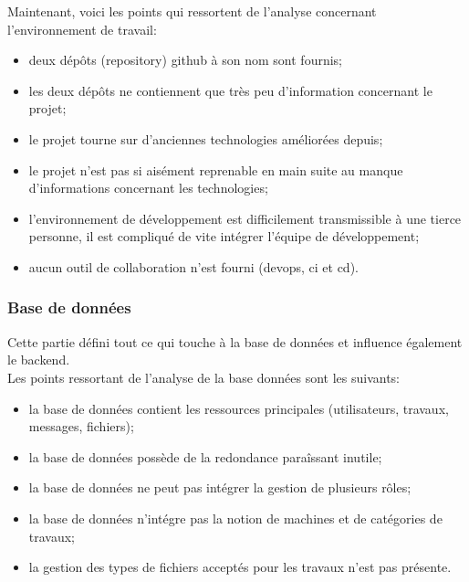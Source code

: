 \documentclass[
    iai, %
    il, %
]{heig-tb}
\begin{document}
Maintenant, voici les points qui ressortent de l'analyse concernant l'environnement de travail:
\begin{itemize}
    \item deux dépôts (\Gls{repository}) \Gls{github} à son nom sont fournis;
    \item les deux dépôts ne contiennent que très peu d'information concernant le projet;
    \item le projet tourne sur d'anciennes technologies améliorées depuis;
    \item le projet n'est pas si aisément reprenable en main suite au manque d'informations concernant les technologies;
    \item l'environnement de développement est difficilement transmissible à une tierce personne, il est compliqué de vite intégrer l'équipe de développement;
    \item aucun outil de collaboration n'est fourni (\Gls{devops}, \Gls{ci} et \Gls{cd}).
\end{itemize}

\subsubsection{Base de données}
Cette partie défini tout ce qui touche à la base de données et influence également le \Gls{backend}.\\
Les points ressortant de l'analyse de la base données sont les suivants:
\begin{itemize}
    \item la base de données contient les ressources principales (utilisateurs, travaux, messages, fichiers);
    \item la base de données possède de la redondance paraîssant inutile;
    \item la base de données ne peut pas intégrer la gestion de plusieurs rôles;
    \item la base de données n'intégre pas la notion de machines et de catégories de travaux;
    \item la gestion des types de fichiers acceptés pour les travaux n'est pas présente.
\end{itemize}

\newpage
\end{document}
